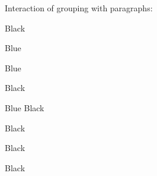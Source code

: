 \documentclass[10pt]{article}
\begin{document}
Interaction of grouping with paragraphs:


Black { \color{blue} Blue

Blue } Black


{\color{blue} Blue} Black

Black


\color{black}

 Black

Black
\end{document}
